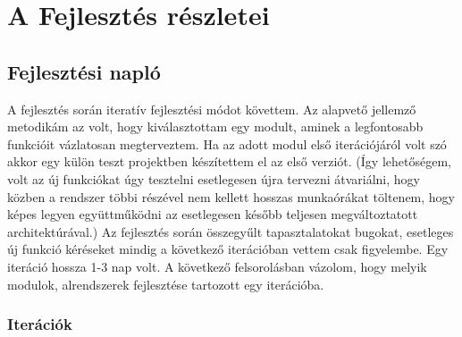 \documentclass[a4paper,12pt,oneside]{report}
\begin{document}
\section{A Fejlesztés részletei}
\subsection{Fejlesztési napló}
A fejlesztés során iteratív fejlesztési módot követtem. Az alapvető jellemző metodikám az volt, hogy kiválasztottam egy modult, aminek a legfontosabb funkcióit vázlatosan megterveztem. Ha az adott modul első iterációjáról volt szó akkor egy külön teszt projektben készítettem el az első verziót. (Így lehetőségem, volt az új funkciókat úgy tesztelni esetlegesen újra tervezni átvariálni, hogy közben a rendszer többi részével nem kellett hosszas munkaórákat töltenem, hogy képes legyen együttműködni az esetlegesen később teljesen megváltoztatott architektúrával.) Az fejlesztés során összegyűlt tapasztalatokat bugokat, esetleges új funkció kéréseket mindig a következő iterációban vettem csak figyelembe. Egy iteráció hossza 1-3 nap volt. A következő felsorolásban vázolom, hogy melyik modulok, alrendszerek fejlesztése tartozott egy iterációba.
\subsubsection{Iterációk}
\end{document}
